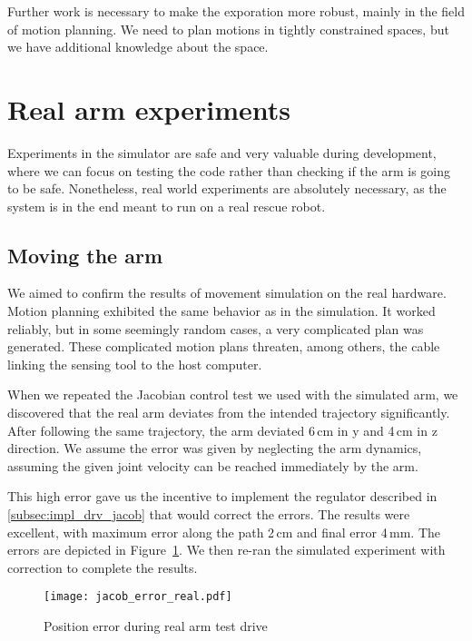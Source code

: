 \documentclass[buriama8_dp.tex]{subfiles}
\begin{document}
Further work is necessary to make the exporation more robust, mainly in the field of motion planning. We need to plan motions in tightly constrained spaces, but we have additional knowledge about the space.


\section{Real arm experiments}
\label{sec:exp_real_arm}

Experiments in the simulator are safe and very valuable during development, where we can focus on testing the code rather than checking if the arm is going to be safe. Nonetheless, real world experiments are absolutely necessary, as the system is in the end meant to run on a real rescue robot.

\subsection{Moving the arm}
\label{subsec:exp_move_real}

We aimed to confirm the results of movement simulation on the real hardware. Motion planning exhibited the same behavior as in the simulation. It worked reliably, but in some seemingly random cases, a very complicated plan was generated. These complicated motion plans threaten, among others, the cable linking the sensing tool to the host computer.

When we repeated the Jacobian control test we used with the simulated arm, we discovered that the real arm deviates from the intended trajectory significantly. After following the same trajectory, the arm deviated 6\,cm in \m y and 4\,cm in \m z direction. We assume the error was given by neglecting the arm dynamics, assuming the given joint velocity can be reached immediately by the arm.

This high error gave us the incentive to implement the regulator described in \ref{subsec:impl_drv_jacob} that would correct the errors. The results were excellent, with maximum error along the path 2\,cm and final error 4\,mm. The errors are depicted in Figure~\ref{fig:err_jac_real}. We then re-ran the simulated experiment with correction to complete the results.

\begin{figure}[ht]
  \centering
  \texttt{[image: jacob\_error\_real.pdf]}
  \caption{Position error during real arm test drive}
  \label{fig:err_jac_real}
\end{figure}
\end{document}
